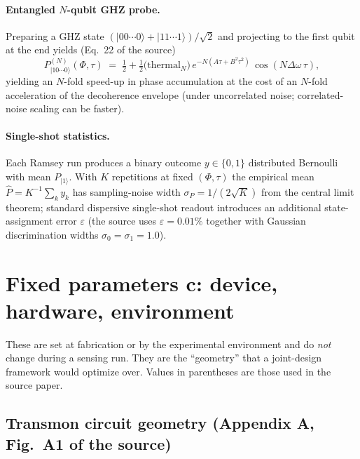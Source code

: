 \documentclass[11pt,a4paper]{article}
\begin{document}
\paragraph{Entangled $N$-qubit GHZ probe.}
Preparing a GHZ state $(|00\cdots0\rangle + |11\cdots1\rangle)/\sqrt{2}$ and projecting to the first qubit at the end yields (Eq.~22 of the source)
\begin{equation}
  P_{|10\cdots 0\rangle}^{(N)}(\Phi,\tau) \;=\; \tfrac{1}{2} + \tfrac{1}{2}\bigl(\text{thermal}_N\bigr)\,e^{-N(A\tau + B^2\tau^2)}\,\cos(N\Delta\omega\,\tau),
  \label{eq:ghz}
\end{equation}
yielding an $N$-fold speed-up in phase accumulation at the cost of an $N$-fold acceleration of the decoherence envelope (under uncorrelated noise; correlated-noise scaling can be faster).

\paragraph{Single-shot statistics.}
Each Ramsey run produces a binary outcome $y\in\{0,1\}$ distributed Bernoulli with mean $P_{|1\rangle}$.  With $K$ repetitions at fixed $(\Phi,\tau)$ the empirical mean $\hat P = K^{-1}\sum_k y_k$ has sampling-noise width $\sigma_P = 1/(2\sqrt{K})$ from the central limit theorem; standard dispersive single-shot readout introduces an additional state-assignment error $\varepsilon$ (the source uses $\varepsilon = 0.01\%$ together with Gaussian discrimination widths $\sigma_0 = \sigma_1 = 1.0$).

\section{Fixed parameters \texorpdfstring{$\bm{c}$}{c}: device, hardware, environment}
\label{sec:c_params}

These are set at fabrication or by the experimental environment and do \emph{not} change during a sensing run.  They are the ``geometry'' that a joint-design framework would optimize over.  Values in parentheses are those used in the source paper.

\subsection{Transmon circuit geometry (Appendix A, Fig.~A1 of the source)}
\end{document}
